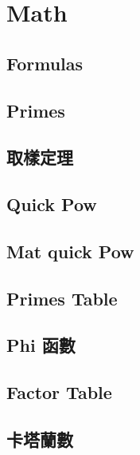 \section{Math}

\subsection{Formulas}


\subsection{Primes}


\subsection{取樣定理}


\subsection{Quick Pow}


\subsection{Mat quick Pow}


\subsection{Primes Table}


\subsection{Phi 函數}


\subsection{Factor Table}


\subsection{卡塔蘭數}


